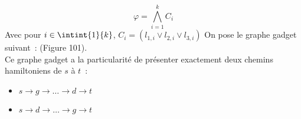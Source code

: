\begin{demonstration}
\begin{itemize}
            $$\varphi = \bigwedge_{i=1}^kC_i$$
        Avec pour $i \in \intint{1}{k}$, $C_i = (l_{1,i} \vee l_{2,i} \vee l_{3,i})$
        On pose le graphe gadget suivant~: (Figure 101).\\
        Ce graphe gadget a la particularité de présenter exactement deux chemins hamiltoniens de $s$ à $t$~:
        \begin{itemize}
            \item $s \rightarrow g \rightarrow \dots \rightarrow d \rightarrow t$
            \item $s \rightarrow d \rightarrow \dots \rightarrow g \rightarrow t$
        \end{itemize}
    \end{itemize}
\end{demonstration}

